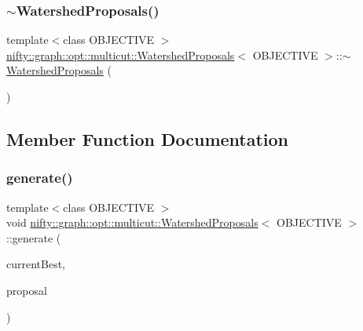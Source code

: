 \mbox{\label{classnifty_1_1graph_1_1opt_1_1multicut_1_1WatershedProposals_ad66bba72cf18799a092676b354c252a5}} 
\subsubsection{\texorpdfstring{$\sim$\+Watershed\+Proposals()}{~WatershedProposals()}}
{\footnotesize\ttfamily template$<$class O\+B\+J\+E\+C\+T\+I\+VE $>$ \\
\hyperlink{classnifty_1_1graph_1_1opt_1_1multicut_1_1WatershedProposals}{nifty\+::graph\+::opt\+::multicut\+::\+Watershed\+Proposals}$<$ O\+B\+J\+E\+C\+T\+I\+VE $>$\+::$\sim$\hyperlink{classnifty_1_1graph_1_1opt_1_1multicut_1_1WatershedProposals}{Watershed\+Proposals} (\begin{DoxyParamCaption}{ }\end{DoxyParamCaption})\hspace{0.3cm}{\ttfamily [inline]}}



\subsection{Member Function Documentation}
\mbox{\label{classnifty_1_1graph_1_1opt_1_1multicut_1_1WatershedProposals_a8fdb72d28492ef820838d9b673af48ea}} 
\subsubsection{\texorpdfstring{generate()}{generate()}}
{\footnotesize\ttfamily template$<$class O\+B\+J\+E\+C\+T\+I\+VE $>$ \\
void \hyperlink{classnifty_1_1graph_1_1opt_1_1multicut_1_1WatershedProposals}{nifty\+::graph\+::opt\+::multicut\+::\+Watershed\+Proposals}$<$ O\+B\+J\+E\+C\+T\+I\+VE $>$\+::generate (\begin{DoxyParamCaption}\item[{const \hyperlink{classnifty_1_1graph_1_1opt_1_1multicut_1_1WatershedProposals_a41e2d6c837cbe4d58aa4279419483723}{Node\+Labels\+Type} \&}]{current\+Best,  }\item[{\hyperlink{classnifty_1_1graph_1_1opt_1_1multicut_1_1WatershedProposals_a41e2d6c837cbe4d58aa4279419483723}{Node\+Labels\+Type} \&}]{proposal }\end{DoxyParamCaption})\hspace{0.3cm}{\ttfamily [inline]}}


